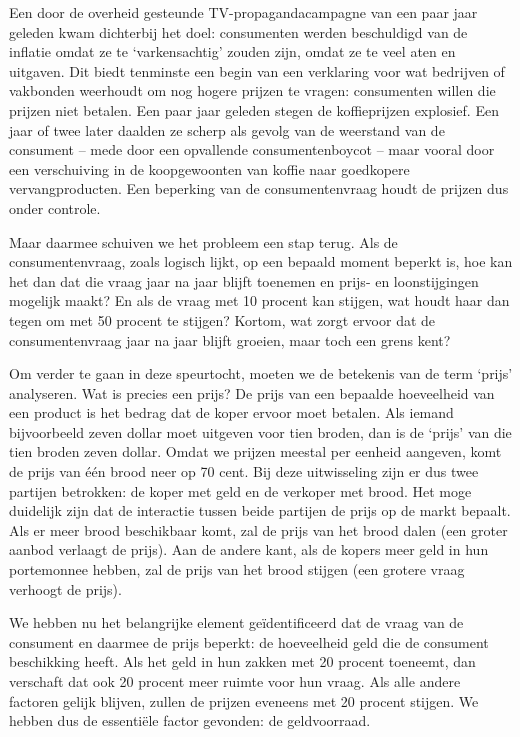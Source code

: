 \documentclass[
  a5paper,
  smalldemyvopaper,10pt,twoside,onecolumn,openright,extrafontsizes,hidelinks]{memoir}
\begin{document}
Een door de overheid gesteunde TV-propagandacampagne van een paar jaar
geleden kwam dichterbij het doel: consumenten werden beschuldigd van de
inflatie omdat ze te `varkensachtig' zouden zijn, omdat ze te veel aten
en uitgaven. Dit biedt tenminste een begin van een verklaring voor wat
bedrijven of vakbonden weerhoudt om nog hogere prijzen te vragen:
consumenten willen die prijzen niet betalen. Een paar jaar geleden
stegen de koffieprijzen explosief. Een jaar of twee later daalden ze
scherp als gevolg van de weerstand van de consument -- mede door een
opvallende consumentenboycot -- maar vooral door een verschuiving in de
koopgewoonten van koffie naar goedkopere vervangproducten. Een beperking
van de consumentenvraag houdt de prijzen dus onder controle.

Maar daarmee schuiven we het probleem een stap terug. Als de
consumentenvraag, zoals logisch lijkt, op een bepaald moment beperkt is,
hoe kan het dan dat die vraag jaar na jaar blijft toenemen en prijs- en
loonstijgingen mogelijk maakt? En als de vraag met 10 procent kan
stijgen, wat houdt haar dan tegen om met 50 procent te stijgen? Kortom,
wat zorgt ervoor dat de consumentenvraag jaar na jaar blijft groeien,
maar toch een grens kent?

Om verder te gaan in deze speurtocht, moeten we de betekenis van de term
`prijs' analyseren. Wat is precies een prijs? De prijs van een bepaalde
hoeveelheid van een product is het bedrag dat de koper ervoor moet
betalen. Als iemand bijvoorbeeld zeven dollar moet uitgeven voor tien
broden, dan is de `prijs' van die tien broden zeven dollar. Omdat we
prijzen meestal per eenheid aangeven, komt de prijs van één brood neer
op 70 cent. Bij deze uitwisseling zijn er dus twee partijen betrokken:
de koper met geld en de verkoper met brood. Het moge duidelijk zijn dat
de interactie tussen beide partijen de prijs op de markt bepaalt. Als er
meer brood beschikbaar komt, zal de prijs van het brood dalen (een
groter aanbod verlaagt de prijs). Aan de andere kant, als de kopers meer
geld in hun portemonnee hebben, zal de prijs van het brood stijgen (een
grotere vraag verhoogt de prijs).

We hebben nu het belangrijke element geïdentificeerd dat de vraag van de
consument en daarmee de prijs beperkt: de hoeveelheid geld die de
consument beschikking heeft. Als het geld in hun zakken met 20 procent
toeneemt, dan verschaft dat ook 20 procent meer ruimte voor hun vraag.
Als alle andere factoren gelijk blijven, zullen de prijzen eveneens met
20 procent stijgen. We hebben dus de essentiële factor gevonden: de
geldvoorraad.
\end{document}
